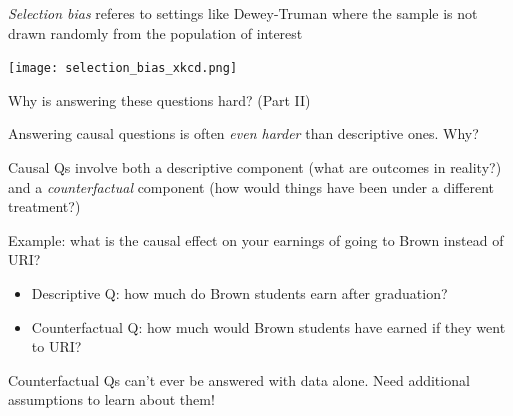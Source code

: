 \documentclass[11pt,english,handout]{beamer}
\newenvironment{wideitemize}{\itemize\addtolength{\itemsep}{10pt}}{\enditemize}
\begin{document}
\begin{frame}
\textit{Selection bias} referes to settings like Dewey-Truman where the sample is not drawn randomly from the population of interest

\texttt{[image: selection\_bias\_xkcd.png]}
\end{frame}


\begin{frame}{Why is answering these questions hard? (Part II)}
\begin{wideitemize}
	\item
	Answering causal questions is often \textit{even harder} than descriptive ones. Why?
	
	\pause
	\item
	Causal Qs involve both a descriptive component (what are outcomes in reality?) and a \textit{counterfactual} component (how would things have been under a different treatment?)
	
	\pause
	\item
	Example: what is the causal effect on your earnings of going to Brown instead of URI? 
		\begin{itemize}
			\item
			Descriptive Q: how much do Brown students earn after graduation? 
			
			\item
			Counterfactual Q: how much would Brown students have earned if they went to URI?  
		\end{itemize}
		
	\pause 	
	\item Counterfactual Qs can't ever be answered with data alone. Need additional assumptions to learn about them!	
\end{wideitemize}	
\end{frame}
\end{document}
